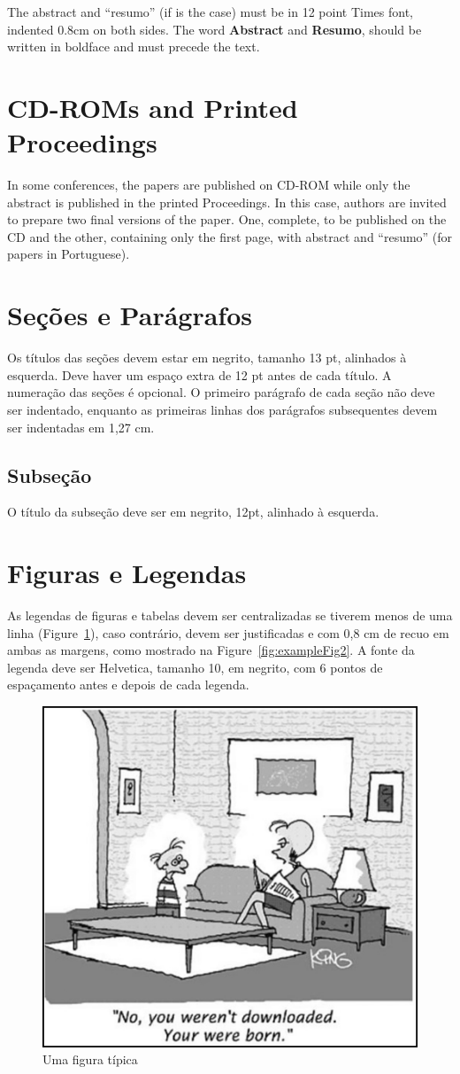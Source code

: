 \documentclass[12pt]{article}
\begin{document}
The abstract and ``resumo'' (if is the case) must be in 12 point Times font,
indented 0.8cm on both sides. The word \textbf{Abstract} and \textbf{Resumo},
should be written in boldface and must precede the text.

\section{CD-ROMs and Printed Proceedings}

In some conferences, the papers are published on CD-ROM while only the
abstract is published in the printed Proceedings. In this case, authors are
invited to prepare two final versions of the paper. One, complete, to be
published on the CD and the other, containing only the first page, with
abstract and ``resumo'' (for papers in Portuguese).

\section{Seções e Parágrafos}

Os títulos das seções devem estar em negrito, tamanho 13 pt, alinhados à esquerda. Deve haver um espaço extra de 12 pt antes de cada título. A numeração das seções é opcional. O primeiro parágrafo de cada seção não deve ser indentado, enquanto as primeiras linhas dos parágrafos subsequentes devem ser indentadas em 1,27 cm.
\subsection{Subseção}

O título da subseção deve ser em negrito, 12pt, alinhado à esquerda.

\section{Figuras e Legendas}\label{sec:figs}

As legendas de figuras e tabelas devem ser centralizadas se tiverem menos de uma linha (Figure~\ref{fig:exampleFig1}), caso contrário, devem ser justificadas e com 0,8 cm de recuo em ambas as margens, como mostrado na Figure~\ref{fig:exampleFig2}. A fonte da legenda deve ser Helvetica, tamanho 10, em negrito, com 6 pontos de espaçamento antes e depois de cada legenda.

\begin{figure}[ht]
\centering
\includegraphics[width=.5\textwidth]{fig1.jpg}
\caption{Uma figura típica}
\label{fig:exampleFig1}
\end{figure}
\end{document}
